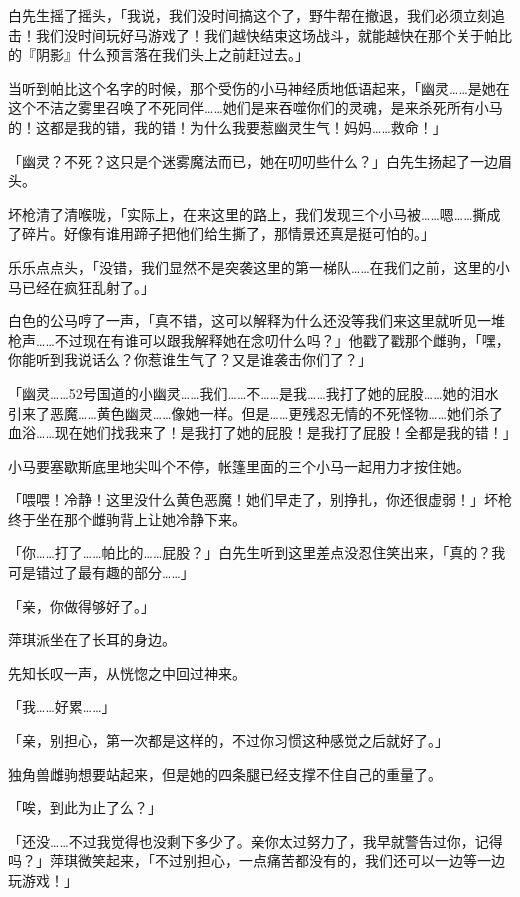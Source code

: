 白先生摇了摇头，「我说，我们没时间搞这个了，野牛帮在撤退，我们必须立刻追击！我们没时间玩好马游戏了！我们越快结束这场战斗，就能越快在那个关于帕比的『阴影』什么预言落在我们头上之前赶过去。」

当听到帕比这个名字的时候，那个受伤的小马神经质地低语起来，「幽灵……是她在这个不洁之雾里召唤了不死同伴……她们是来吞噬你们的灵魂，是来杀死所有小马的！这都是我的错，我的错！为什么我要惹幽灵生气！妈妈……救命！」

「幽灵？不死？这只是个迷雾魔法而已，她在叨叨些什么？」白先生扬起了一边眉头。

坏枪清了清喉咙，「实际上，在来这里的路上，我们发现三个小马被……嗯……撕成了碎片。好像有谁用蹄子把他们给生撕了，那情景还真是挺可怕的。」

乐乐点点头，「没错，我们显然不是突袭这里的第一梯队……在我们之前，这里的小马已经在疯狂乱射了。」

白色的公马哼了一声，「真不错，这可以解释为什么还没等我们来这里就听见一堆枪声……不过现在有谁可以跟我解释她在念叨什么吗？」他戳了戳那个雌驹，「嘿，你能听到我说话么？你惹谁生气了？又是谁袭击你们了？」

「幽灵……52号国道的小幽灵……我们……不……是我……我打了她的屁股……她的泪水引来了恶魔……黄色幽灵……像她一样。但是……更残忍无情的不死怪物……她们杀了血浴……现在她们找我来了！是我打了她的屁股！是我打了屁股！全都是我的错！」

小马要塞歇斯底里地尖叫个不停，帐篷里面的三个小马一起用力才按住她。

「喂喂！冷静！这里没什么黄色恶魔！她们早走了，别挣扎，你还很虚弱！」坏枪终于坐在那个雌驹背上让她冷静下来。

「你……打了……帕比的……屁股？」白先生听到这里差点没忍住笑出来，「真的？我可是错过了最有趣的部分……」

\horizonline


「亲，你做得够好了。」

萍琪派坐在了长耳的身边。

先知长叹一声，从恍惚之中回过神来。

「我……好累……」

「亲，别担心，第一次都是这样的，不过你习惯这种感觉之后就好了。」

独角兽雌驹想要站起来，但是她的四条腿已经支撑不住自己的重量了。

「唉，到此为止了么？」

「还没……不过我觉得也没剩下多少了。亲你太过努力了，我早就警告过你，记得吗？」萍琪微笑起来，「不过别担心，一点痛苦都没有的，我们还可以一边等一边玩游戏！」

